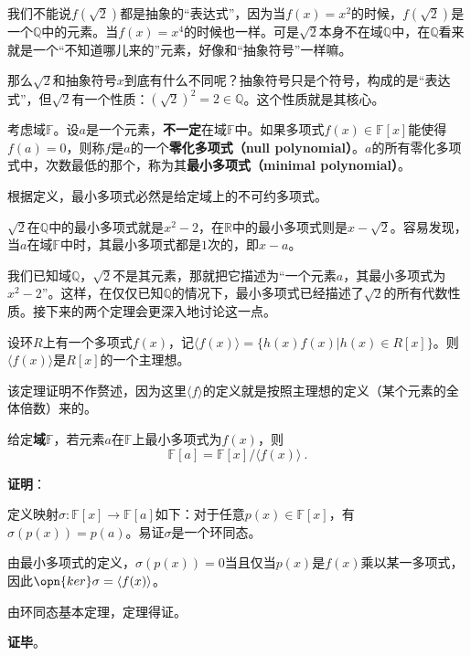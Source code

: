 我们不能说$f(\sqrt{2})$都是抽象的“表达式”，因为当$f(x)=x^2$的时候，$f(\sqrt{2})$是一个$\mathbb{Q}$中的元素。当$f(x)=x^4$的时候也一样。可是$\sqrt{2}$本身不在域$\mathbb{Q}$中，在$\mathbb{Q}$看来就是一个“不知道哪儿来的”元素，好像和“抽象符号”一样嘛。

那么$\sqrt{2}$和抽象符号$x$到底有什么不同呢？抽象符号只是个符号，构成的是“表达式”，但$\sqrt{2}$有一个性质：$(\sqrt{2})^2=2\in\mathbb{Q}$。这个性质就是其核心。

\begin{definition}{}
考虑域$\mathbb{F}$。设$a$是一个元素，\textbf{不一定}在域$\mathbb{F}$中。如果多项式$f(x)\in\mathbb{F}[x]$能使得$f(a)=0$，则称$f$是$a$的一个\textbf{零化多项式（null polynomial）}。$a$的所有零化多项式中，次数最低的那个，称为其\textbf{最小多项式（minimal polynomial）}。
\end{definition}

根据定义，最小多项式必然是给定域上的不可约多项式。



$\sqrt{2}$在$\mathbb{Q}$中的最小多项式就是$x^2-2$，在$\mathbb{R}$中的最小多项式则是$x-\sqrt{2}$。容易发现，当$a$在域$\mathbb{F}$中时，其最小多项式都是$1$次的，即$x-a$。

我们已知域$\mathbb{Q}$，$\sqrt{2}$不是其元素，那就把它描述为“一个元素$a$，其最小多项式为$x^2-2$”。这样，在仅仅已知$\mathbb{Q}$的情况下，最小多项式已经描述了$\sqrt{2}$的所有代数性质。接下来的两个定理会更深入地讨论这一点。



\begin{theorem}{}%

设环$R$上有一个多项式$f(x)$，记$\langle f(x) \rangle=\{h(x)f(x)|h(x)\in R[x]\}$。则$\langle f(x) \rangle$是$R[x]$的一个主理想。

\end{theorem}

该定理证明不作赘述，因为这里$\langle f \rangle$的定义就是按照主理想的定义（某个元素的全体倍数）来的。





\begin{theorem}{}\label{the_RPlynm_2}%

给定\textbf{域}$\mathbb{F}$，若元素$a$在$\mathbb{F}$上最小多项式为$f(x)$，则
\begin{equation}
\mathbb{F}[a]=\mathbb{F}[x]/\langle f(x) \rangle ~.
\end{equation}

\end{theorem}



\textbf{证明}：

定义映射$\sigma:\mathbb{F}[x]\to\mathbb{F}[a]$如下：对于任意$p(x)\in\mathbb{F}[x]$，有$\sigma(p(x))=p(a)$。易证$\sigma$是一个环同态。

由最小多项式的定义，$\sigma(p(x))=0$当且仅当$p(x)$是$f(x)$乘以某一多项式，因此$\opn{ker}\sigma = \langle f(x) \rangle$。

由环同态基本定理，定理得证。

\textbf{证毕}。












